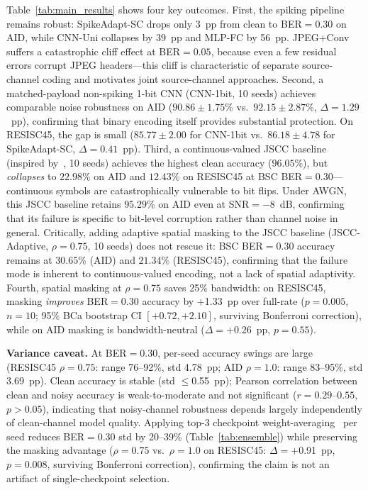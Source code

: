\documentclass[conference]{IEEEtran}
\begin{document}
Table~\ref{tab:main_results} shows four key outcomes. First, the spiking pipeline remains robust: SpikeAdapt-SC drops only 3~pp from clean to BER$=0.30$ on AID, while CNN-Uni collapses by 39~pp and MLP-FC by 56~pp. JPEG+Conv suffers a catastrophic cliff effect at BER$=0.05$, because even a few residual errors corrupt JPEG headers---this cliff is characteristic of separate source-channel coding and motivates joint source-channel approaches. Second, a matched-payload non-spiking 1-bit CNN (CNN-1bit, 10 seeds) achieves comparable noise robustness on AID ($90.86{\pm}1.75$\% vs.\ $92.15{\pm}2.87$\%, $\Delta{=}1.29$~pp), confirming that binary encoding itself provides substantial protection. On RESISC45, the gap is small ($85.77{\pm}2.00$ for CNN-1bit vs.\ $86.18{\pm}4.78$ for SpikeAdapt-SC, $\Delta{=}0.41$~pp). Third, a continuous-valued JSCC baseline (inspired by~\cite{li2024djscc}, 10 seeds) achieves the highest clean accuracy ($96.05$\%), but \emph{collapses} to $22.98$\% on AID and $12.43$\% on RESISC45 at BSC BER$=0.30$---continuous symbols are catastrophically vulnerable to bit flips. Under AWGN, this JSCC baseline retains $95.29$\% on AID even at SNR$=-8$~dB, confirming that its failure is specific to bit-level corruption rather than channel noise in general. Critically, adding adaptive spatial masking to the JSCC baseline (JSCC-Adaptive, $\rho{=}0.75$, 10 seeds) does not rescue it: BSC BER$=0.30$ accuracy remains at $30.65$\% (AID) and $21.34$\% (RESISC45), confirming that the failure mode is inherent to continuous-valued encoding, not a lack of spatial adaptivity. Fourth, spatial masking at $\rho{=}0.75$ saves 25\% bandwidth: on RESISC45, masking \emph{improves} BER$=0.30$ accuracy by $+$1.33~pp over full-rate ($p{=}0.005$, $n{=}10$; 95\% BCa bootstrap CI $[+0.72, +2.10]$, surviving Bonferroni correction), while on AID masking is bandwidth-neutral ($\Delta{=}+$0.26~pp, $p{=}0.55$).

\textbf{Variance caveat.} At BER$=0.30$, per-seed accuracy swings are large (RESISC45 $\rho{=}0.75$: range 76--92\%, std 4.78~pp; AID $\rho{=}1.0$: range 83--95\%, std 3.69~pp). Clean accuracy is stable (std $\leq$0.55~pp); Pearson correlation between clean and noisy accuracy is weak-to-moderate and not significant ($r{=}0.29$--$0.55$, $p{>}0.05$), indicating that noisy-channel robustness depends largely independently of clean-channel model quality. Applying top-3 checkpoint weight-averaging~\cite{izmailov2018swa} per seed reduces BER$=0.30$ std by 20--39\% (Table~\ref{tab:ensemble}) while preserving the masking advantage ($\rho{=}0.75$ vs.\ $\rho{=}1.0$ on RESISC45: $\Delta{=}+$0.91~pp, $p{=}0.008$, surviving Bonferroni correction), confirming the claim is not an artifact of single-checkpoint selection.
\end{document}
